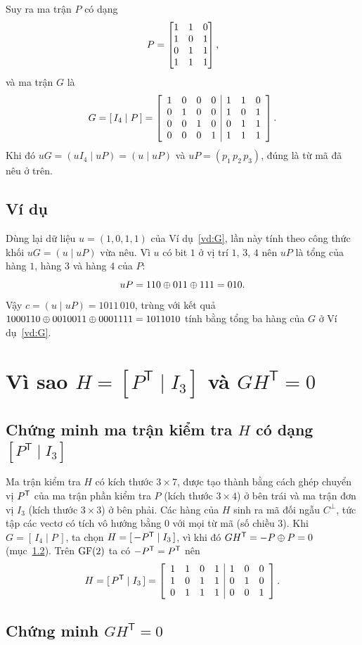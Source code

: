 Suy ra ma trận $P$ có dạng
\[
  P = \begin{bmatrix} 1 & 1 & 0\\ 1 & 0 & 1\\ 0 & 1 & 1\\ 1 & 1 & 1 \end{bmatrix} ,
\]
và ma trận $G$ là
\[
  G = [\,I_4 \mid P\,] = \left[\begin{array}{cccc|ccc} 1 & 0 & 0 & 0 & 1 & 1 & 0\\ 0 & 1 & 0 & 0 & 1 & 0 & 1\\ 0 & 0 & 1 & 0 & 0 & 1 & 1\\ 0 & 0 & 0 & 1 & 1 & 1 & 1 \end{array}\right] .
\]
Khi đó $uG = (uI_4 \mid uP) = (u \mid uP)$ và $uP = (p_1\,p_2\,p_3)$, đúng là
từ mã đã nêu ở trên.

\subsection{Ví dụ}
\label{ss:2.1.2}

Dùng lại dữ liệu $u = (1,0,1,1)$ của Ví dụ~\ref{vd:G}, lần này tính theo công
thức khối $uG = (u \mid uP)$ vừa nêu. Vì $u$ có bit $1$ ở vị trí $1$, $3$, $4$
nên $uP$ là tổng của hàng $1$, hàng $3$ và hàng $4$ của $P$:
\[
  uP = 110 \oplus 011 \oplus 111 = 010 .
\]
Vậy $c = (u \mid uP) = 1011\,010$, trùng với kết quả
$1000110 \oplus 0010011 \oplus 0001111 = 1011010$ tính bằng tổng ba hàng của $G$ ở
Ví dụ~\ref{vd:G}.

\section{Vì sao \texorpdfstring{$H = [P^{\mathsf T} \mid I_3]$ và $GH^{\mathsf T} = 0$}{H = [PT | I3] và GHT = 0}}
\label{sec:2.2}

\subsection{Chứng minh ma trận kiểm tra \texorpdfstring{$H$}{H} có dạng \texorpdfstring{$[P^{\mathsf T} \mid I_3]$}{[PT | I3]}}
\label{ss:2.2.1}

Ma trận kiểm tra $H$ có kích thước $3 \times 7$, được tạo thành bằng cách ghép
chuyển vị $P^{\mathsf{T}}$ của ma trận phần kiểm tra $P$ (kích thước $3 \times 4$) ở bên
trái và ma trận đơn vị $I_3$ (kích thước $3 \times 3$) ở bên phải. Các hàng của
$H$ sinh ra mã đối ngẫu $C^{\perp}$, tức tập các vectơ có tích vô hướng bằng
$0$ với mọi từ mã (số chiều $3$). Khi $G = [\,I_4 \mid P\,]$,
ta chọn $H = [\,-P^{\mathsf{T}} \mid I_3\,]$, vì khi đó
$GH^{\mathsf{T}} = -P \oplus P = 0$ (mục~\ref{ss:2.2.2}). Trên $\mathrm{GF}(2)$ ta có $-P^{\mathsf{T}} = P^{\mathsf{T}}$ nên
\[
  H = [\,P^{\mathsf{T}} \mid I_3\,] = \left[\begin{array}{cccc|ccc} 1 & 1 & 0 & 1 & 1 & 0 & 0\\ 1 & 0 & 1 & 1 & 0 & 1 & 0\\ 0 & 1 & 1 & 1 & 0 & 0 & 1 \end{array}\right] .
\]

\subsection{Chứng minh \texorpdfstring{$GH^{\mathsf T} = 0$}{G HT = 0}}
\label{ss:2.2.2}

